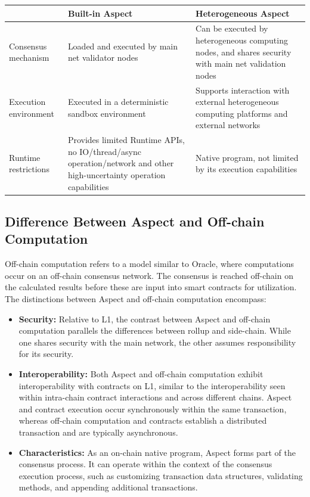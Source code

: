 \begin{table}[htbp]
    \centering
    \begin{tabular}{|l|p{6cm}|p{6cm}|}
      \hline
      & Built-in Aspect & Heterogeneous Aspect \\
      \hline
      Consensus mechanism & Loaded and executed by main net validator nodes & Can be executed by heterogeneous computing nodes, and shares security with main net validation nodes \\
      \hline
      Execution environment & Executed in a deterministic sandbox environment & Supports interaction with external heterogeneous computing platforms and external networks \\
      \hline
      Runtime restrictions & Provides limited Runtime APIs, no IO/thread/async operation/network and other high-uncertainty operation capabilities & Native program, not limited by its execution capabilities \\
      \hline
    \end{tabular}
  \end{table}
  


\subsection{Difference Between Aspect and Off-chain Computation}

Off-chain computation refers to a model similar to Oracle, where computations occur on an off-chain consensus network. The consensus is reached off-chain on the calculated results before these are input into smart contracts for utilization.
The distinctions between Aspect and off-chain computation encompass:

\begin{itemize}
  \item \textbf{Security:} Relative to L1, the contrast between Aspect and off-chain computation parallels the differences between rollup and side-chain. While one shares security with the main network, the other assumes responsibility for its security.
  \item \textbf{Interoperability:} Both Aspect and off-chain computation exhibit interoperability with contracts on L1, similar to the interoperability seen within intra-chain contract interactions and across different chains. Aspect and contract execution occur synchronously within the same transaction, whereas off-chain computation and contracts establish a distributed transaction and are typically asynchronous.
  \item \textbf{Characteristics:} As an on-chain native program, Aspect forms part of the consensus process. It can operate within the context of the consensus execution process, such as customizing transaction data structures, validating methods, and appending additional transactions.
\end{itemize}

